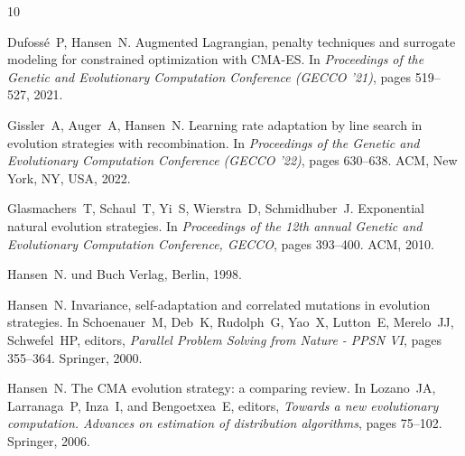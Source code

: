 \documentclass{article} %
\begin{document}
\begin{thebibliography}{10}


Dufoss{\'e}~P, Hansen~N.
\newblock Augmented Lagrangian, penalty techniques and surrogate modeling for
  constrained optimization with CMA-ES.
\newblock In {\em Proceedings of the Genetic and Evolutionary Computation
  Conference ({GECCO} '21)}, pages 519--527, 2021.

Gissler~A, Auger~A, Hansen~N.
\newblock Learning rate adaptation by line search in evolution strategies with
  recombination.
\newblock In {\em Proceedings of the Genetic and Evolutionary Computation
  Conference ({GECCO} '22)}, pages 630--638. ACM, New York, NY, USA, 2022.

Glasmachers~T, Schaul~T, Yi~S, Wierstra~D, Schmidhuber~J.
\newblock Exponential natural evolution strategies.
\newblock In {\it Proceedings of the 12th annual Genetic and Evolutionary Computation Conference, GECCO}, pages 393--400. ACM, 2010.

Hansen~N.
 und {Buch} {Verlag}, Berlin, 1998.

Hansen~N.
\newblock Invariance, self-adaptation and correlated mutations in evolution
  strategies.
\newblock In Schoenauer~M, Deb~K, Rudolph~G, Yao~X, Lutton~E,
Merelo~JJ, Schwefel~HP, editors, {\em Parallel Problem Solving from Nature - PPSN
  VI}, pages 355--364. Springer, 2000.

Hansen~N.
\newblock The {CMA} evolution strategy: a comparing review.
\newblock In Lozano~JA, Larranaga~P, Inza~I, and Bengoetxea~E, editors,
  {\em Towards a new evolutionary computation. Advances on estimation of
  distribution algorithms}, pages 75--102. Springer, 2006.


\end{thebibliography}
\end{document}
